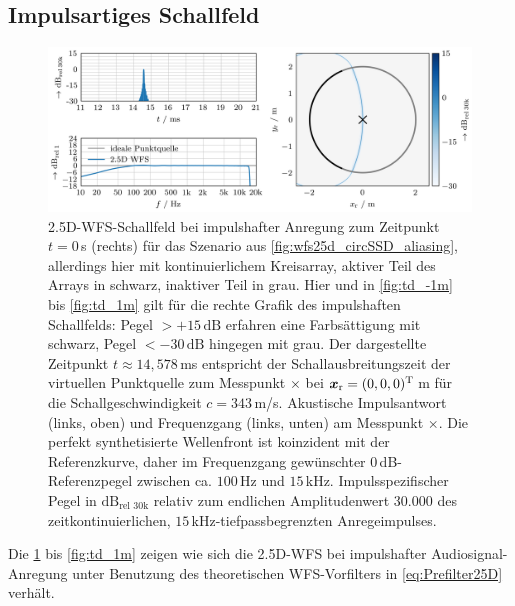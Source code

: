\subsection{Impulsartiges Schallfeld}
%
\begin{figure}[t]
\centering
\begin{plotfigures}
\includegraphics[width=145mm]{../python/wfs25d_circSSD_noaliasing_time_domain_x0.00_m_py_DEU.png}
\end{plotfigures}
\caption{2.5D-WFS-Schallfeld bei impulshafter Anregung zum Zeitpunkt $t=0$\,s
(rechts) für das Szenario aus \Abb\ref{fig:wfs25d_circSSD_aliasing}, allerdings
hier mit kontinuierlichem Kreisarray, aktiver Teil des Arrays in schwarz,
inaktiver Teil in grau.
%
Hier und in \Abb\ref{fig:td_-1m} bis \ref{fig:td_1m} gilt für die
rechte Grafik des impulshaften Schallfelds:
%
Pegel $>+15\,\text{dB}$ erfahren eine Farbsättigung mit schwarz,
Pegel $<-30\,\text{dB}$ hingegen mit grau.
%
Der dargestellte Zeitpunkt $t \approx 14{,}578$\,ms entspricht der
Schallausbreitungszeit der virtuellen Punktquelle zum Messpunkt $\times$ bei
$\bm{x}_\mathrm{r}=(0,0,0)^\mathrm{T}$\,m für die Schallgeschwindigkeit $c=343$\,m/s.
%
Akustische Impulsantwort (links, oben) und Frequenzgang (links, unten)
am Messpunkt $\times$.
%
Die perfekt synthetisierte Wellenfront ist koinzident mit der Referenzkurve,
daher im Frequenzgang gewünschter $0$\,dB-Referenzpegel
zwischen ca. $100$\,Hz und $15$\,kHz.
%
Impulsspezifischer Pegel in $\text{dB}_{\text{rel }30\text{k}}$ relativ zum
endlichen Amplitudenwert $30{.}000$ des zeitkontinuierlichen, $15$\,kHz-tiefpassbegrenzten Anregeimpulses.
%
\cc
}
\label{fig:td_0m_noaliasing}
\end{figure}
%
Die
\Abb\ref{fig:td_0m_noaliasing} bis \ref{fig:td_1m}
zeigen wie sich die 2.5D-WFS bei impulshafter Audiosignal-Anregung unter Benutzung
des theoretischen WFS-Vorfilters in \Glg\eqref{eq:Prefilter25D} verhält.
